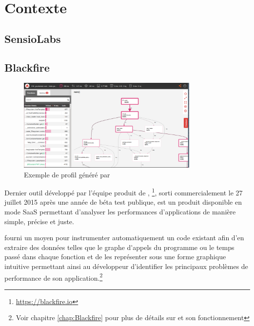 \setcounter{part}{1}

\chapter{Contexte}
	\setcounter{chapter}{1}
	\section{SensioLabs}



	\section{Blackfire}

\begin{figure}[!h]
\begin{center}
    \includegraphics[width=0.8\textwidth]{images/blackfire-exemple}
  \caption{Exemple de profil généré par \Blackfire}
  \centering
\end{center}
\end{figure}

Dernier outil développé par l'équipe produit de \SensioLabs, \Blackfire\footnote{\url{https://blackfire.io}},
sorti commercialement le 27 juillet 2015 après une année de béta test publique, est un produit disponible en mode \gls{SaaS} permettant d'analyser les performances d'applications \PHP de manière simple, précise et juste.

\Blackfire fourni un moyen pour instrumenter automatiquement un code \PHP existant afin d'en extraire des données telles que le \gls{graphe d'appels} du programme ou le temps passé dans chaque fonction et de les représenter sous une forme graphique intuitive permettant ainsi au développeur d'identifier les principaux problèmes de performance de son application.\footnote{Voir chapitre \vref{chap:Blackfire} pour plus de détails sur \Blackfire et son fonctionnement}

